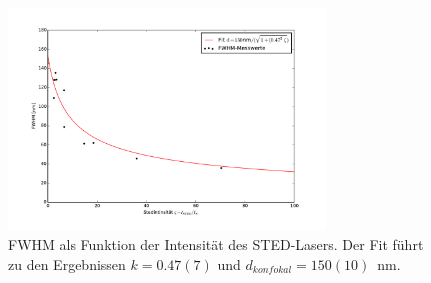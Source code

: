 \begin{figure}
	\centering
	\includegraphics[width=0.75\textwidth]{plots/fwhm_zeta.pdf}
	\caption{FWHM als Funktion der Intensität des STED-Lasers. Der Fit führt zu den Ergebnissen $k = 0.47(7)$ und $d_{konfokal} = 150(10)$~nm. 
	}\label{fig:sted_res}
\end{figure}

